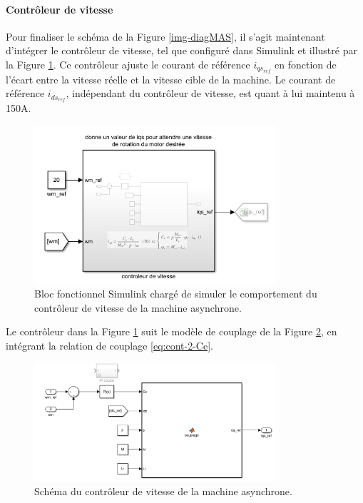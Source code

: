 \FloatBarrier
\paragraph{Contrôleur de vitesse}

Pour finaliser le schéma de la Figure \ref{img-diagMAS}, il s'agit maintenant d'intégrer le contrôleur de vitesse, tel que configuré dans Simulink et illustré par la Figure \ref{img-MAS_controleur_vitesse}. Ce contrôleur ajuste le courant de référence \( i_{qs_{ref}} \) en fonction de l'écart entre la vitesse réelle et la vitesse cible de la machine. Le courant de référence \( i_{ds_{ref}} \), indépendant du contrôleur de vitesse, est quant à lui maintenu à 150A.

\begin{figure}[!h]
    \centering
    \includegraphics[width=0.8\textwidth]{imgsMATLAB/MAS/MAS/MAS_controleur_vitesse.png} 
    \caption{Bloc fonctionnel Simulink chargé de simuler le comportement du contrôleur de vitesse de la machine asynchrone.}
    \label{img-MAS_controleur_vitesse}
\end{figure}

Le contrôleur dans la Figure \ref{img-MAS_controleur_vitesse} suit le modèle de couplage de la Figure \ref{img-CV_couplage}, en intégrant la relation de couplage \ref{eq:cont-2-Ce}.

\begin{figure}[!h]
    \centering
    \includegraphics[width=0.8\textwidth]{imgsMATLAB/MAS/CV/CV_couplage.png} 
    \caption{Schéma du contrôleur de vitesse de la machine asynchrone.}
    \label{img-CV_couplage}
\end{figure}







